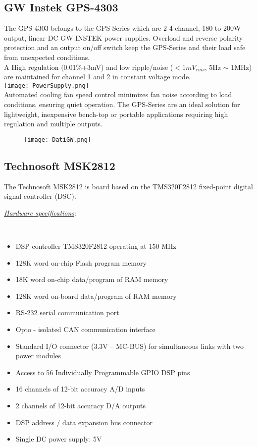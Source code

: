 \documentclass[12pt]{article}
\begin{document}
\subsection{GW Instek GPS-4303}

The GPS-4303 belongs to the GPS-Series which are 2-4 channel, 180 to 200W output, linear DC GW INSTEK power supplies. 
Overload and reverse polarity protection and an output on/off switch keep the GPS-Series and their load safe from unexpected conditions.\\
A High regulation (0.01\%+3mV) and low ripple/noise ($< 1mV_{rms}$, 5Hz $\sim$ 1MHz) are maintained for channel 1 and 2 in constant voltage mode.\\

\texttt{[image: PowerSupply.png]}\\[0.7cm]
Automated cooling fan speed control
minimizes fan noise according to load conditions, ensuring quiet operation. The GPS-Series are an
ideal solution for lightweight, inexpensive bench-top or portable applications requiring high regulation
and multiple outputs.

\begin{figure}[h]
\centering
\texttt{[image: DatiGW.png]}
\end{figure}

\subsection{Technosoft MSK2812}

The Technosoft MSK2812 is board based on the TMS320F2812 fixed-point digital signal controller (DSC).\\[0.7cm]

\begin{Large}\textit{\underline{Hardware specifications}}:\end{Large}\\
\begin{itemize}
\item DSP controller TMS320F2812 operating at 150 MHz
\item 128K word on-chip Flash program memory
\item 18K word on-chip data/program of RAM memory
\item 128K word on-board data/program of RAM memory
\item RS-232 serial communication port
\item Opto - isolated CAN communication interface
\item Standard I/O connector (3.3V – MC-BUS) for simultaneous links with two power modules
\item Access to 56 Individually Programmable GPIO DSP pins
\item 16 channels of 12-bit accuracy A/D inputs
\item 2 channels of 12-bit accuracy D/A outputs
\item DSP address / data expansion bus connector
\item Single DC power supply: 5V
\end{itemize}
\end{document}
